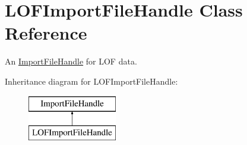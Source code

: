 \hypertarget{class_l_o_f_import_file_handle}{}\section{L\+O\+F\+Import\+File\+Handle Class Reference}
\label{class_l_o_f_import_file_handle}


An \hyperlink{class_import_file_handle}{Import\+File\+Handle} for L\+OF data.  


Inheritance diagram for L\+O\+F\+Import\+File\+Handle\+:\begin{figure}[H]
\begin{center}
\leavevmode
\includegraphics[height=2.000000cm]{class_l_o_f_import_file_handle}
\end{center}
\end{figure}
